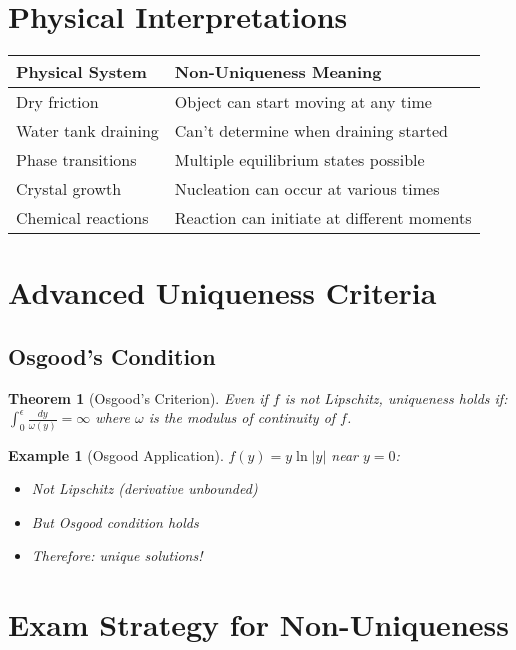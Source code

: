 \documentclass[12pt]{article}
\newtheorem{theorem}{Theorem}
\newtheorem{example}{Example}
\begin{document}
\section{Physical Interpretations}

\begin{table}[h]
\centering
\begin{tabular}{|l|l|}
\hline
\textbf{Physical System} & \textbf{Non-Uniqueness Meaning} \\
\hline
Dry friction & Object can start moving at any time \\
Water tank draining & Can't determine when draining started \\
Phase transitions & Multiple equilibrium states possible \\
Crystal growth & Nucleation can occur at various times \\
Chemical reactions & Reaction can initiate at different moments \\
\hline
\end{tabular}
\end{table}

\section{Advanced Uniqueness Criteria}

\subsection{Osgood's Condition}

\begin{theorem}[Osgood's Criterion]
Even if $f$ is not Lipschitz, uniqueness holds if:
$\int_0^\epsilon \frac{dy}{\omega(y)} = \infty$
where $\omega$ is the modulus of continuity of $f$.
\end{theorem}

\begin{example}[Osgood Application]
$f(y) = y\ln|y|$ near $y = 0$:
\begin{itemize}
    \item Not Lipschitz (derivative unbounded)
    \item But Osgood condition holds
    \item Therefore: unique solutions!
\end{itemize}
\end{example}

\section{Exam Strategy for Non-Uniqueness}
\end{document}

